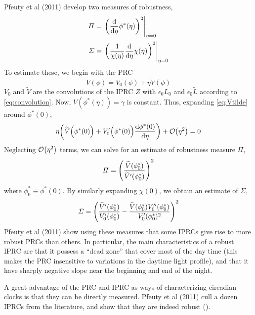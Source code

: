 Pfeuty et al (2011) develop two measures of robustness,
\begin{equation}
\begin{aligned}
\varPi &=\eval{\qty(\dv{\eta} \phi^{*}(\eta) )^{2}}_{\eta=0}
\\
\varSigma &=\eval{\qty(\frac{1}{\chi(\eta)}
\dv{\eta} \chi(\eta) )^{2}}_{\eta=0}
\end{aligned}
\end{equation}
To estimate these, we begin with the PRC
\begin{equation}\label{eq:Vtilde}
V(\phi)=V_{0}(\phi)
+\eta\widetilde{V}(\phi)
\end{equation}
$V_{0}$ and $\widetilde{V}$ are the convolutions of the IPRC 
$Z$ with $\epsilon_{0}L_{0}$ and 
$\epsilon_{0}\widetilde{L}$ according to \eqref{eq:convolution}. Now, 
$V({\phi}^{*}(\eta))=\gamma$ is constant. Thus, expanding
\eqref{eq:Vtilde} around $\phi^{*}(0)$, 
\begin{equation}
\eta \qty(\widetilde{V}\Big(\phi^{*}(0)\Big)
+{V}_{0}'\Big(\phi^*(0)\Big)\dv{\phi^{*}(0)}{\eta})
+\order{\eta^2} = 0
\end{equation}
Neglecting $\order{\eta^2}$ terms, we can solve for an estimate of
robustness measure $\varPi$,
\begin{equation}
\varPi=\qty(
\frac{\widetilde{V}(\phi_{0}^{*})}
{\widetilde{V}'(\phi_{0}^{*})}
)^{2}
\end{equation}
where $\phi_{0}^{*}\equiv\phi^{*}(0)$. By similarly
expanding $\chi(0)$, we obtain an estimate of $\varSigma$,
\begin{equation}
\varSigma =\qty(
\frac{\widetilde{V}'(\phi_0^{*})}
{V_0'(\phi_0^{*})}
-\frac{\widetilde{V}(\phi_0^{*}){V}_0''(\phi_0^{*})}
{V_0'(\phi_0^{*})^{2}}
)^{2}
\end{equation}
Pfeuty et al (2011) show using these measures that some IPRCs give
rise to more robust PRCs than others. In particular, the main
characteristics of a robust IPRC are that it possess a “dead zone”
that cover most of the day time (this makes the PRC insensitive to
variations in the daytime light profile), and that it have sharply
negative slope near the beginning and end of the night. 

A great advantage of the PRC and IPRC as ways of characterizing
circadian clocks is that they can be directly measured. Pfeuty et al
(2011) cull a dozen IPRCs from the literature, and show that they are
indeed robust (). 



\clearpage
\vspace{-.5cm}
